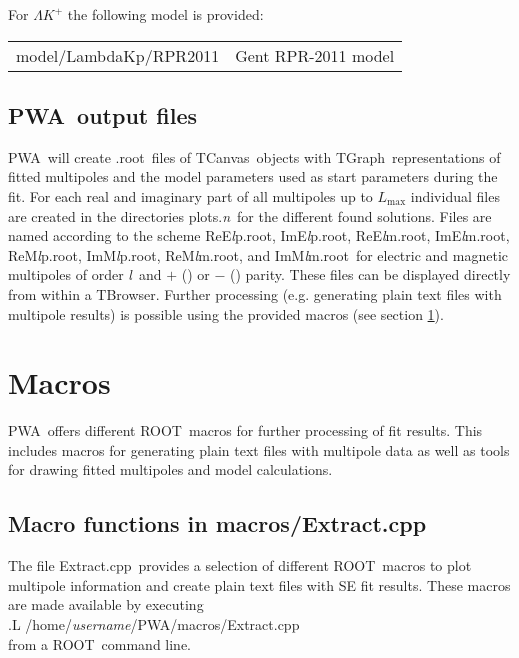 \documentclass[a4paper,10pt]{article}
\def\PWA{\ttfamily PWA\rmfamily\ }
\def\tt{\ttfamily}
\def\rm{\rmfamily}
\begin{document}
For $\Lambda K^+$ the following model is provided: \vspace{-0.25em}\\
\begin{tabular}{ll}
\hspace{-0.5em}\tt model/LambdaKp/RPR2011\rm & Gent RPR-2011 model\vspace{-0.1em}\\
\end{tabular}

\subsection{\PWA output files}\label{sec_output}

\PWA will create \tt .root\rm\ files of \tt TCanvas\rm\ objects with \tt TGraph\rm\ representations of fitted multipoles
and the model parameters used as start parameters during the fit. For each real and imaginary part of all multipoles up to
$L_\mathrm{max}$ individual files are created in the directories \tt plots.\textit{n}\rm\ for the different found solutions.
Files are named according to the scheme 
\tt ReE\textit{l}p.root\rm, \tt ImE\textit{l}p.root\rm,
\tt ReE\textit{l}m.root\rm, \tt ImE\textit{l}m.root\rm,
\tt ReM\textit{l}p.root\rm, \tt ImM\textit{l}p.root\rm,
\tt ReM\textit{l}m.root\rm, and \tt ImM\textit{l}m.root\rm\
for electric and magnetic multipoles of order \tt\textit{l}\rm\ and $+$ (\tt{p}\rm) or $-$ (\tt{m}\rm) parity.
These files can be displayed directly from within a \tt TBrowser\rm.
Further processing (e.g. generating plain text files with multipole results) is possible using the provided macros (see section
\ref{sec_macros}).

\section{Macros}\label{sec_macros}

\PWA offers different \tt ROOT\rm\ macros for further processing of fit results. This includes macros for generating plain text
files with multipole data as well as tools for drawing fitted multipoles and model calculations.

\subsection{Macro functions in  \tt macros/Extract.cpp\rm}

The file \tt Extract.cpp\rm\ provides a selection of different \tt ROOT\rm\ macros to plot multipole information
and create plain text files with SE fit results. These macros are made available by executing\\
\tt .L /home/\textit{username}/PWA/macros/Extract.cpp\rm\\
from a \tt ROOT\rm\ command line.
\end{document}
